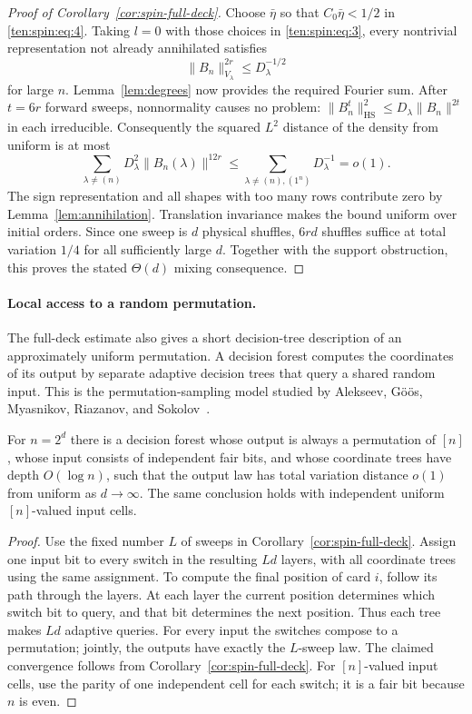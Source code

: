 \begin{proof}[Proof of Corollary~\ref{cor:spin-full-deck}]
Choose \(\bar\eta\) so that \(C_0\bar\eta<1/2\) in \eqref{ten:spin:eq:4}. Taking \(l=0\) with those choices in \eqref{ten:spin:eq:3}, every nontrivial representation not already annihilated satisfies
\[
 \|B_n\|_{V_\lambda}^{2r}\le D_\lambda^{-1/2}
\]
for large \(n\). Lemma~\ref{lem:degrees} now provides the required Fourier sum.
After $t=6r$ forward sweeps, nonnormality causes no problem:
$\|B_n^t\|_{\mathrm{HS}}^2\le D_\lambda\|B_n\|^{2t}$ in each
irreducible. Consequently the squared $L^2$ distance of the density
from uniform is at most
\[
 \sum_{\lambda\ne(n)}D_\lambda^2\|B_n(\lambda)\|^{12r}
 \le\sum_{\lambda\ne(n),(1^n)}D_\lambda^{-1}=o(1).
\]
The sign representation and all shapes with too many rows contribute
zero by Lemma~\ref{lem:annihilation}. Translation invariance makes the
bound uniform over initial orders. Since one sweep is $d$ physical
shuffles, $6rd$ shuffles suffice at total variation $1/4$ for all
sufficiently large $d$. Together with the support obstruction, this
proves the stated $\Theta(d)$ mixing consequence.
\end{proof}

\paragraph{Local access to a random permutation.}
The full-deck estimate also gives a short decision-tree description of
an approximately uniform permutation. A decision forest computes the
coordinates of its output by separate adaptive decision trees that
query a shared random input. This is the permutation-sampling model
studied by Alekseev, G\"o\"os, Myasnikov, Riazanov, and
Sokolov~\cite[Section~1]{AlekseevEtAl2025}.

\begin{corollary}
\label{cor:decision-forest}
For $n=2^d$ there is a decision forest whose output is always a
permutation of $[n]$, whose input consists of independent fair bits,
and whose coordinate trees have depth $O(\log n)$, such that the
output law has total variation distance $o(1)$ from uniform as
$d\to\infty$. The same conclusion holds with independent uniform
$[n]$-valued input cells.
\end{corollary}
\begin{proof}
Use the fixed number $L$ of sweeps in
Corollary~\ref{cor:spin-full-deck}. Assign one input bit to every
switch in the resulting $Ld$ layers, with all coordinate trees
using the same assignment. To compute the final position of card
$i$, follow its path through the layers. At each layer the current
position determines which switch bit to query, and that bit determines
the next position. Thus each tree makes $Ld$ adaptive queries. For
every input the switches compose to a permutation; jointly, the
outputs have exactly the $L$-sweep law. The claimed convergence follows
from Corollary~\ref{cor:spin-full-deck}. For $[n]$-valued input cells,
use the parity of one independent cell for each switch; it is a fair
bit because $n$ is even.
\end{proof}

